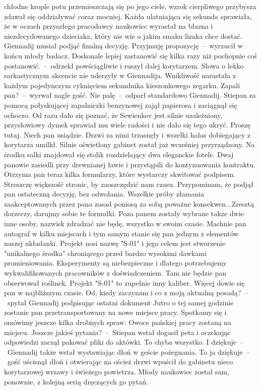 \documentclass[../MAIN.tex]{subfiles}
\begin{document}
chłodne krople potu przemieszczają się po jego ciele, wzrok
cierpliwego przybysza zdawał się oddziaływać coraz mocniej.
Każda ulatniająca się sekunda sprawiała, że w oczach przyszłego
pracodawcy naukowiec wyrastał na błazna i niezdecydowanego
dzieciaka, który nie wie o jakim smaku lizaka chce dostać.
Giennadij musiał podjąć finalną decyzję.
\xx Przyjmuję propozycję~--~wyrzucił w końcu młody badacz.
\xx Doskonale lepiej zastanowić się kilka razy niż pochopnie
coś postanowić.~--~odrzekł powściągliwie i ruszył dalej
korytarzem.
Słowa o lekko sarkastycznym akcencie nie uderzyły w Giennadija.
Wnikliwość narastała z każdym pojedynczym cyknięciem sekundnika
kieszonkowego zegarku.
\xx Zapali pan?~--~wyrwał nagle gość.
\xx Nie palę~--~odparł standardowo Giennadij.
Stiepan za pomocą połyskującej zapalniczki benzynowej zajął
papierosa i zaciągnął się ochoczo. Od razu dało się poznać, że
Sewienkov jest silnie uzależniony, przysłowiowy dymek sprawiał
mu wiele radości i nie dało się tego ukryć.
\xx Proszę tutaj. Niech pan usiądzie.
\qd
Drzwi za nimi trzasnęły i wszelki hałas dobiegający z korytarza
umilkł. Silnie oświetlony gabinet został już wcześniej
przyrządzony. Na środku salki znajdował się stolik
rozdzielający dwa eleganckie fotele. Dwaj panowie zasiedli przy
drewnianej ławie i przystąpili do kontynuowania kontraktu.
%
\sx Otrzyma pan teraz kilka formularzy, które wystarczy
skwitować podpisem. Streszczę większość stronic, by
zaoszczędzić nam czasu. Przypominam, że podjął pan ostateczną
decyzję, bez odwołania. Wszelkie próby złamania zaakceptowanych
przez pana zasad poniosą za sobą poważne konsekwen...Zresztą
dorzeczy, darujmy sobie te formułki. Poza panem zostały wybrane
także dwie inne osoby, nazwisk zdradzać nie będę, wszystko w
swoim czasie. Machnie pan autograf w kilku miejscach i tym
samym stanie się pan jednym z elementów naszej układanki.
Projekt nosi nazwę "S-01" i jego celem jest stworzenie
"unikalnego środka" chroniącego przed bardzo wysokimi dawkami
promieniowania. Eksperymenty są niebezpieczne i dlatego
potrzebujemy wykwalifikowanych pracowników z doświadczeniem.
Tam nie będzie pan obserwował roślinek. Projekt "S-01" to
zupełnie inny kaliber. Więcej dowie się pan w najbliższym
czasie.
\xx Od, kiedy zaczynam i co z moją aktualną posadą?~--~spytał
Giennadij podpisując ostatni dokument
\xx Jutro o tej samej godzinie zostanie pan przetransportowany
na nowe miejsce pracy. Spotkamy się i omówimy jeszcze kilka
drobnych spraw. Owoce pańskiej pracy zostaną na miejscu.
Jeszcze jakieś pytania?~--~Stiepan wstał dogasił peta i
oczekując odpowiedzi zaczął pakować pliki do aktówki.
\xx To chyba wszystko. I dziękuje~--~Giennadij także wstał
wystawiając dłoń w geście pożegnania.
\xx To ja dziękuje~--~gość uścisnął dłoń i otwierając na oścież
drzwi wpuścił do gabinetu nieco korytarzowej wrzawy i świeżego
powietrza.
\qd
Młody naukowiec został sam, ponownie, z kolejną serią
dręczących go pytań.
\end{document}
